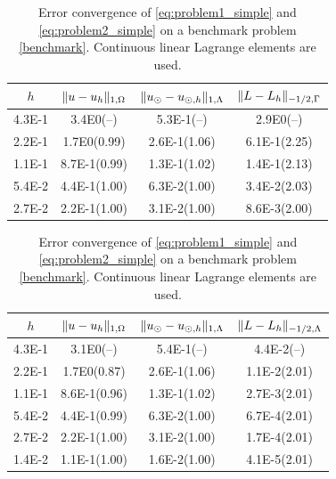 \documentclass[r]{siamart171218}
\begin{document}
%
\begin{table}
  \scriptsize{
    \begin{minipage}{0.49\textwidth}
  \begin{center}
    \begin{tabular}{c|ccc}
      \hline
    $h$ & $\lVert{u-u_h}\rVert_{1, \Omega}$ & $\lVert{u_{\odot}-u_{\odot, h}}\rVert_{1, \Lambda}$ & $\lVert{L-L_h}\rVert_{-1/2,\Gamma}$\\
      \hline
4.3E-1 & 3.4E0(--) & 5.3E-1(--) & 2.9E0(--)\\
2.2E-1 & 1.7E0(0.99) & 2.6E-1(1.06) & 6.1E-1(2.25)\\
1.1E-1 & 8.7E-1(0.99) & 1.3E-1(1.02) & 1.4E-1(2.13)\\
5.4E-2 & 4.4E-1(1.00) & 6.3E-2(1.00) & 3.4E-2(2.03)\\
2.7E-2 & 2.2E-1(1.00) & 3.1E-2(1.00) & 8.6E-3(2.00)\\
\hline
  \end{tabular}
  \end{center}
  \end{minipage}
    }
    \vspace{5pt}
  \scriptsize{%
    \begin{minipage}{0.49\textwidth}
      \begin{center}
        \begin{tabular}{c|ccc}
      \hline
    $h$ & $\lVert{u-u_h}\rVert_{1, \Omega}$ & $\lVert{u_{\odot}-u_{\odot, h}}\rVert_{1, \Lambda}$ & $\lVert{L-L_h}\rVert_{-1/2, \Lambda}$\\
      \hline
4.3E-1 & 3.1E0(--)    & 5.4E-1(--)   & 4.4E-2(--)   \\
2.2E-1 & 1.7E0(0.87)  & 2.6E-1(1.06) & 1.1E-2(2.01) \\
1.1E-1 & 8.6E-1(0.96) & 1.3E-1(1.02) & 2.7E-3(2.01) \\
5.4E-2 & 4.4E-1(0.99) & 6.3E-2(1.00) & 6.7E-4(2.01) \\
2.7E-2 & 2.2E-1(1.00) & 3.1E-2(1.00) & 1.7E-4(2.01) \\
1.4E-2 & 1.1E-1(1.00) & 1.6E-2(1.00) & 4.1E-5(2.01) \\
\hline
  \end{tabular}
  \end{center}
  \end{minipage}
  }
  \caption{Error convergence of \eqref{eq:problem1_simple} and \eqref{eq:problem2_simple}
    on a benchmark problem \eqref{benchmark}. Continuous linear Lagrange
    elements are used.
  }
  \label{tab:error_conform}
\end{table}
\end{document}
